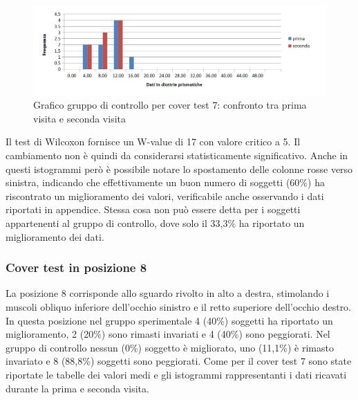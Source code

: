  \begin{figure}[h!]
	\centering
	\includegraphics[scale=0.8]{source/grafici/cover_test_7_giustissimo_non_trattati.png}
	\caption[figure]{Grafico gruppo di controllo per cover test 7: confronto tra prima visita e seconda visita}
	\label{fig:issuexample}
\end{figure}

Il test di Wilcoxon fornisce un W-value di 17 con valore critico a 5. Il cambiamento non è quindi da considerarsi statisticamente significativo. Anche in questi istogrammi però è possibile notare lo spostamento delle colonne rosse verso sinistra, indicando che effettivamente un buon numero di soggetti (60\%) ha riscontrato un miglioramento dei valori, verificabile anche osservando i dati riportati in appendice. Stessa cosa non può essere detta per i soggetti appartenenti al gruppo di controllo, dove solo il 33,3\% ha riportato un miglioramento dei dati.


\subsubsection{Cover test in posizione 8}

La posizione 8 corrisponde allo sguardo rivolto in alto a destra, stimolando i muscoli obliquo inferiore dell’occhio sinistro e il retto superiore dell’occhio destro. In questa posizione nel gruppo sperimentale 4 (40\%) soggetti ha riportato un miglioramento, 2 (20\%) sono rimasti invariati e 4 (40\%) sono peggiorati. Nel gruppo di controllo nessun (0\%) soggetto è migliorato, uno (11,1\%) è rimasto invariato e 8 (88,8\%) soggetti sono peggiorati. Come per il cover test 7 sono state riportate le tabelle dei valori medi e gli istogrammi rappresentanti i dati ricavati durante la prima e seconda visita.

